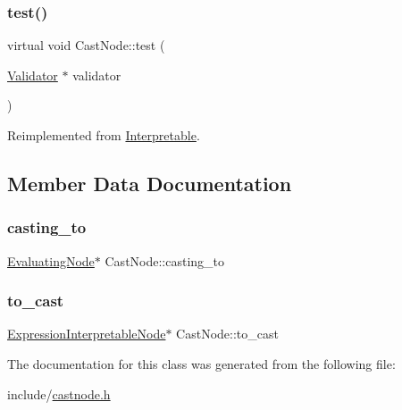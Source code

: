 \mbox{\label{classCastNode_a19fa03c324a6dcbadac32965a86afb3e}} 
\subsubsection{\texorpdfstring{test()}{test()}}
{\footnotesize\ttfamily virtual void Cast\+Node\+::test (\begin{DoxyParamCaption}\item[{\hyperlink{classValidator}{Validator} $\ast$}]{validator }\end{DoxyParamCaption})\hspace{0.3cm}{\ttfamily [virtual]}}



Reimplemented from \hyperlink{classInterpretable_a32f547aaf68dcbab993284d3257ab010}{Interpretable}.



\subsection{Member Data Documentation}
\mbox{\label{classCastNode_adc7612dd690f94026adeea0d98970b57}} 
\subsubsection{\texorpdfstring{casting\+\_\+to}{casting\_to}}
{\footnotesize\ttfamily \hyperlink{classEvaluatingNode}{Evaluating\+Node}$\ast$ Cast\+Node\+::casting\+\_\+to}

\mbox{\label{classCastNode_a01fc0556ce65230a77941f1519b72769}} 
\subsubsection{\texorpdfstring{to\+\_\+cast}{to\_cast}}
{\footnotesize\ttfamily \hyperlink{classExpressionInterpretableNode}{Expression\+Interpretable\+Node}$\ast$ Cast\+Node\+::to\+\_\+cast}



The documentation for this class was generated from the following file\+:\begin{DoxyCompactItemize}
\item 
include/\hyperlink{castnode_8h}{castnode.\+h}\end{DoxyCompactItemize}
